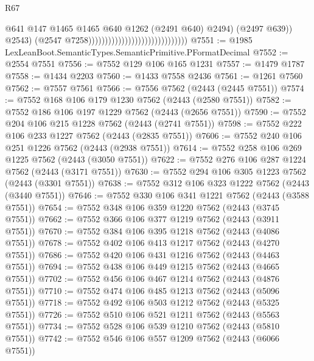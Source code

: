 \begin{lexlean}{R67}
\begin{coremodule}
                                                                    @641
                                                                    @147
                                                                    @1465
                                                                    @1465
                                                                    @640
                                                                    @1262
                                                                    (@2491 @640)
                                                                    @2494)
                                                                  (@2497 @639))
                                                                @2543)
                                                              (@2547
                                                                @7258))))))))))))))))))))))))))))))
@7551 := @1985 LexLeanBoot.SemanticTypes.SemanticPrimitive.PFormatDecimal
@7552 := @2554 @7551
@7556 := @7552 @129 @106 @165 @1231
@7557 := @1479 @1787
@7558 := @1434 @2203
@7560 := @1433 @7558 @2436
@7561 := @1261 @7560
@7562 := @7557 @7561
@7566 := @7556 @7562 (@2443 (@2445 @7551))
@7574 := @7552 @168 @106 @179 @1230 @7562 (@2443 (@2580 @7551))
@7582 := @7552 @186 @106 @197 @1229 @7562 (@2443 (@2656 @7551))
@7590 := @7552 @204 @106 @215 @1228 @7562 (@2443 (@2741 @7551))
@7598 := @7552 @222 @106 @233 @1227 @7562 (@2443 (@2835 @7551))
@7606 := @7552 @240 @106 @251 @1226 @7562 (@2443 (@2938 @7551))
@7614 := @7552 @258 @106 @269 @1225 @7562 (@2443 (@3050 @7551))
@7622 := @7552 @276 @106 @287 @1224 @7562 (@2443 (@3171 @7551))
@7630 := @7552 @294 @106 @305 @1223 @7562 (@2443 (@3301 @7551))
@7638 := @7552 @312 @106 @323 @1222 @7562 (@2443 (@3440 @7551))
@7646 := @7552 @330 @106 @341 @1221 @7562 (@2443 (@3588 @7551))
@7654 := @7552 @348 @106 @359 @1220 @7562 (@2443 (@3745 @7551))
@7662 := @7552 @366 @106 @377 @1219 @7562 (@2443 (@3911 @7551))
@7670 := @7552 @384 @106 @395 @1218 @7562 (@2443 (@4086 @7551))
@7678 := @7552 @402 @106 @413 @1217 @7562 (@2443 (@4270 @7551))
@7686 := @7552 @420 @106 @431 @1216 @7562 (@2443 (@4463 @7551))
@7694 := @7552 @438 @106 @449 @1215 @7562 (@2443 (@4665 @7551))
@7702 := @7552 @456 @106 @467 @1214 @7562 (@2443 (@4876 @7551))
@7710 := @7552 @474 @106 @485 @1213 @7562 (@2443 (@5096 @7551))
@7718 := @7552 @492 @106 @503 @1212 @7562 (@2443 (@5325 @7551))
@7726 := @7552 @510 @106 @521 @1211 @7562 (@2443 (@5563 @7551))
@7734 := @7552 @528 @106 @539 @1210 @7562 (@2443 (@5810 @7551))
@7742 := @7552 @546 @106 @557 @1209 @7562 (@2443 (@6066 @7551))

\end{coremodule}
\end{lexlean}
